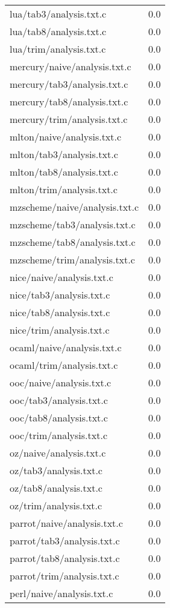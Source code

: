 \begin{longtable}{l r}
{lua/tab3/analysis.txt.c} & 0.0  \\
{lua/tab8/analysis.txt.c} & 0.0  \\
{lua/trim/analysis.txt.c} & 0.0  \\
{mercury/naive/analysis.txt.c} & 0.0  \\
{mercury/tab3/analysis.txt.c} & 0.0  \\
{mercury/tab8/analysis.txt.c} & 0.0  \\
{mercury/trim/analysis.txt.c} & 0.0  \\
{mlton/naive/analysis.txt.c} & 0.0  \\
{mlton/tab3/analysis.txt.c} & 0.0  \\
{mlton/tab8/analysis.txt.c} & 0.0  \\
{mlton/trim/analysis.txt.c} & 0.0  \\
{mzscheme/naive/analysis.txt.c} & 0.0  \\
{mzscheme/tab3/analysis.txt.c} & 0.0  \\
{mzscheme/tab8/analysis.txt.c} & 0.0  \\
{mzscheme/trim/analysis.txt.c} & 0.0  \\
{nice/naive/analysis.txt.c} & 0.0  \\
{nice/tab3/analysis.txt.c} & 0.0  \\
{nice/tab8/analysis.txt.c} & 0.0  \\
{nice/trim/analysis.txt.c} & 0.0  \\
{ocaml/naive/analysis.txt.c} & 0.0  \\
{ocaml/trim/analysis.txt.c} & 0.0  \\
{ooc/naive/analysis.txt.c} & 0.0  \\
{ooc/tab3/analysis.txt.c} & 0.0  \\
{ooc/tab8/analysis.txt.c} & 0.0  \\
{ooc/trim/analysis.txt.c} & 0.0  \\
{oz/naive/analysis.txt.c} & 0.0  \\
{oz/tab3/analysis.txt.c} & 0.0  \\
{oz/tab8/analysis.txt.c} & 0.0  \\
{oz/trim/analysis.txt.c} & 0.0  \\
{parrot/naive/analysis.txt.c} & 0.0  \\
{parrot/tab3/analysis.txt.c} & 0.0  \\
{parrot/tab8/analysis.txt.c} & 0.0  \\
{parrot/trim/analysis.txt.c} & 0.0  \\
{perl/naive/analysis.txt.c} & 0.0  \\

\end{longtable}
